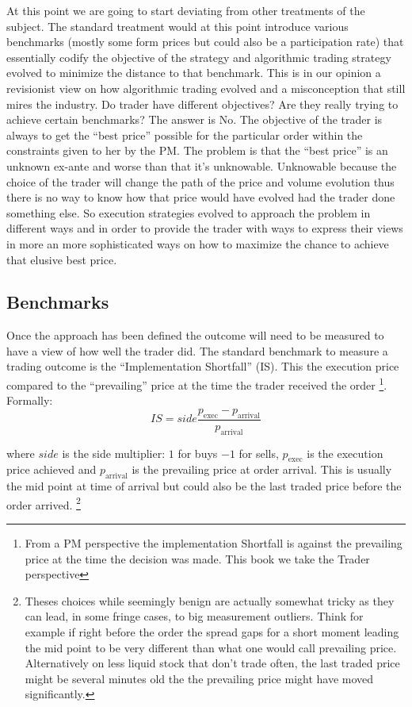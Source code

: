 At this point we are going to start deviating from other treatments of the subject. The standard treatment would at this point introduce various benchmarks (mostly some form prices but could also be a participation rate) that essentially codify the objective of the strategy and algorithmic trading strategy evolved to minimize the distance to that benchmark. This is in our opinion a revisionist view on how algorithmic trading evolved and a misconception that still mires the industry. Do trader have different objectives? Are they really trying to achieve certain benchmarks? The answer is No. The objective of the trader is always to get the ``best price'' possible for the particular order within the constraints given to her by the PM. The problem is that the ``best price''  is an unknown ex-ante and worse than that it's unknowable. Unknowable because the choice of the trader will change the path of the price and volume evolution thus there is no way to know how that price would have evolved had the trader done something else. So execution strategies evolved to approach the problem in  different ways  and in order to provide the trader with ways to express their views in more an more sophisticated ways on how to maximize the chance to achieve that elusive best price.\\


\subsection{Benchmarks}

Once the approach has been defined the outcome will need to be measured to have a view of how well the trader did. The standard benchmark to measure a trading outcome is the ``Implementation Shortfall'' (IS). This the execution price compared to the ``prevailing'' price at the time the trader received the order \footnote{From a PM perspective the implementation Shortfall is against the prevailing price at the time the decision was made. This book we take the Trader perspective}. Formally:
\begin{equation}
	\mathit{IS} = \mathit{side}\frac{p_{\text{exec}} - p_{\text{arrival}}}{p_{\text{arrival}}}
\end{equation}

where $side$ is the side multiplier: $1$ for buys $-1$ for sells, $p_{\text{exec}}$ is the execution price achieved and $p_{\text{arrival}}$ is the prevailing price at order arrival. This is usually the mid point at time of arrival but could also be the last traded price before the order arrived. \footnote{Theses choices while seemingly benign are actually somewhat tricky as they can lead, in some fringe cases, to big measurement outliers. Think for example if right before the order the spread gaps for a short moment leading the mid point to be very different than what one would call prevailing price. Alternatively on less liquid stock that don't trade often, the last traded price might be several minutes old the the prevailing price might have moved significantly.}

